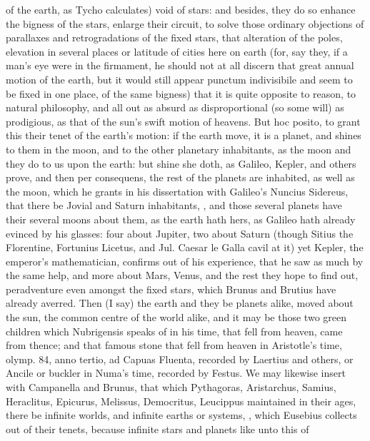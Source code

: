 {of the earth, as Tycho calculates) void of stars: and besides, they do
so enhance the bigness of the stars, enlarge their circuit, to solve
those ordinary objections of parallaxes and retrogradations of the
fixed stars, that alteration of the poles, elevation in several places
or latitude of cities here on earth (for, say they, if a man's eye were
in the firmament, he should not at all discern that great annual motion
of the earth, but it would still appear punctum indivisibile and seem
to be fixed in one place, of the same bigness) that it is quite
opposite to reason, to natural philosophy, and all out as absurd as
disproportional (so some will) as prodigious, as that of the sun's
swift motion of heavens. But hoc posito, to grant this their tenet of
the earth's motion: if the earth move, it is a planet, and shines to
them in the moon, and to the other planetary inhabitants, as the moon
and they do to us upon the earth: but shine she doth, as Galileo,
 Kepler, and others prove, and then per consequens, the rest of
the planets are inhabited, as well as the moon, which he grants in his
dissertation with Galileo's Nuncius Sidereus, that there be
Jovial and Saturn inhabitants, \etc{}, and those several planets have
their several moons about them, as the earth hath hers, as Galileo hath
already evinced by his glasses: four about Jupiter, two about
Saturn (though Sitius the Florentine, Fortunius Licetus, and Jul.
Caesar le Galla cavil at it) yet Kepler, the emperor's mathematician,
confirms out of his experience, that he saw as much by the same help,
and more about Mars, Venus, and the rest they hope to find out,
peradventure even amongst the fixed stars, which Brunus and Brutius
have already averred. Then (I say) the earth and they be planets alike,
moved about the sun, the common centre of the world alike, and it may
be those two green children which  Nubrigensis speaks of in his
time, that fell from heaven, came from thence; and that famous stone
that fell from heaven in Aristotle's time, olymp. 84, anno tertio, ad
Capuas Fluenta, recorded by Laertius and others, or Ancile or buckler
in Numa's time, recorded by Festus. We may likewise insert with
Campanella and Brunus, that which Pythagoras, Aristarchus, Samius,
Heraclitus, Epicurus, Melissus, Democritus, Leucippus maintained in
their ages, there be infinite worlds, and infinite earths or
systems, , which Eusebius collects out of
their tenets, because infinite stars and planets like unto this of
}

